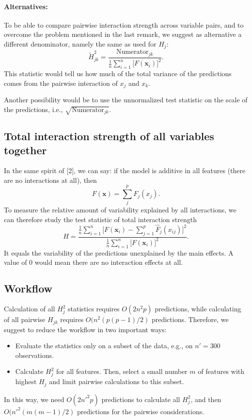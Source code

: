 \documentclass[]{article}
\begin{document}
\paragraph{Alternatives:} To be able to compare pairwise interaction strength across variable pairs, and to overcome the problem mentioned in the last remark, we suggest as alternative a different denominator, namely the same as used for $H_j$:
$$
  \tilde H^2_{jk} = \frac{\mathrm{Numerator}_{jk}}{{\frac{1}{n} \sum_{i = 1}^n\big[F(\mathbf{x}_i)\big]^2}}.
$$
This statistic would tell us how much of the total variance of the predictions comes from the pairwise interaction of $x_j$ and $x_k$.

Another possibility would be to use the unnormalized test statistic on the scale of the predictions, i.e., $\sqrt{\mathrm{Numerator}_{jk}}$.

\subsection{Total interaction strength of all variables together}
In the same spirit of [2], we can say: if the model is additive in all features (there are no interactions at all), then
$$
	F(\mathbf{x}) = \sum_{j}^{p} F_j(x_j).
$$
To measure the relative amount of variability explained by all interactions, we can therefore study the test statistic of total interaction strength
$$
  H = \frac{ {\frac{1}{n} \sum_{i = 1}^n \big[F(\mathbf{x}_i) - \sum_{j = 1}^p\hat F_j(x_{ij})\big]^2}}{{\frac{1}{n} \sum_{i = 1}^n\big[F(\mathbf{x}_i)\big]^2}}.
$$
It equals the variability of the predictions unexplained by the main effects. A value of 0 would mean there are no interaction effects at all.

\subsection{Workflow}
Calculation of all $H_j^2$ statistics requires $O(2n^2p)$ predictions, while calculating of all pairwise $H_{jk}$ requires $O(n^2(p(p-1)/2)$ predictions. Therefore, we suggest to reduce the workflow in two important ways:
\begin{itemize}
\item Evaluate the statistics only on a subset of the data, e.g., on $n' = 300$ observations.
\item Calculate $H_j^2$ for all features. Then, select a small number $m$ of features with highest $H_j$ and limit pairwise calculations to this subset.
\end{itemize}
In this way, we need $O(2n'^2p)$ predictions to calculate all $H_j^2$, and then $O(n'^2(m(m-1)/2)$ predictions for the pairwise considerations.
\end{document}
